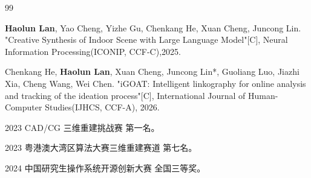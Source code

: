 

\begin{publications}{99}
	\item{\textbf{Haolun Lan}, Yao Cheng, Yizhe Gu, Chenkang He, Xuan Cheng, Juncong Lin}. 
	"Creative Synthesis of Indoor Scene with Large Language Model"[C],
	Neural Information Processing(ICONIP, CCF-C),2025. 
	\item{Chenkang He, \textbf{Haolun Lan}, Xuan Cheng, Juncong Lin*, Guoliang Luo, Jiazhi Xia, Cheng Wang, Wei Chen}. 
    "iGOAT: Intelligent linkography for online analysis and tracking of the ideation process"[C], 
    International Journal of Human-Computer Studies(IJHCS, CCF-A), 2026.

	\item 2023 CAD/CG 三维重建挑战赛 第一名。
	
	\item 2023 粤港澳大湾区算法大赛三维重建赛道 第七名。
	
	\item 2024 中国研究生操作系统开源创新大赛 全国三等奖。


\end{publications}
